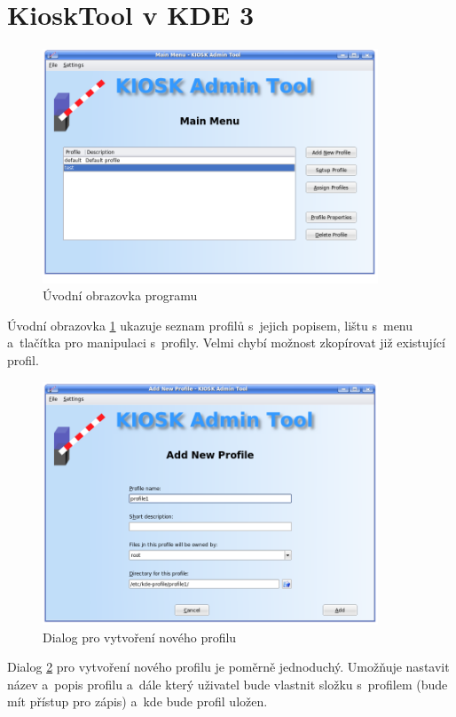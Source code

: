 \section{KioskTool v KDE 3}
\begin{figure}[h!]
    \centering
    \includegraphics[width=10cm]{obrazky/KioskToolKDE3/uvodni_obrazovka.png}
    \caption{Úvodní obrazovka programu}
    \label{fig:kt3_uvodni}
\end{figure}
Úvodní obrazovka \ref{fig:kt3_uvodni} ukazuje seznam profilů s~jejich popisem, lištu s~menu a~tlačítka pro manipulaci s~profily. Velmi chybí možnost zkopírovat již existující profil.

\begin{figure}[h]
    \centering
    \includegraphics[width=10cm]{obrazky/KioskToolKDE3/novy_profil.png}
    \caption{Dialog pro vytvoření nového profilu}
    \label{fig:kt3_novyprofil}
\end{figure}
Dialog \ref{fig:kt3_novyprofil} pro vytvoření nového profilu je poměrně jednoduchý. Umožňuje nastavit název a~popis profilu a~dále který uživatel bude vlastnit složku s~profilem (bude mít přístup pro zápis) a~kde bude profil uložen.


